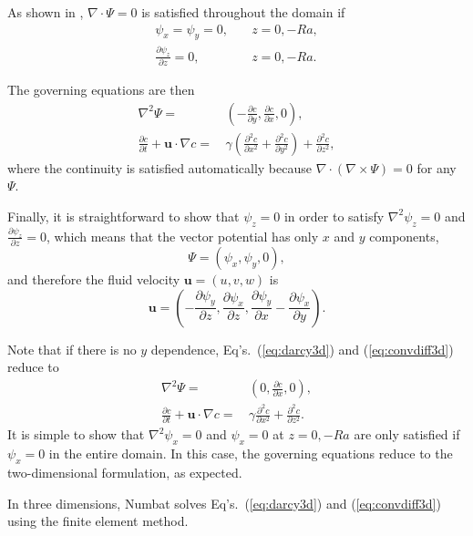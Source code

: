 \documentclass[11pt, a4paper]{csiroreport2012}
\begin{document}
As shown in \cite{E1997}, $\nabla \cdot \Psi = 0$ is satisfied throughout the domain if
\begin{align}
\psi_x = \psi_y = 0,& \quad z = 0, -Ra, \nonumber \\
\frac{\partial \psi_z}{\partial z} = 0, & \quad  z = 0, -Ra.
\end{align}

The governing equations are then
\begin{align}
\nabla^2 \Psi = \,& \left(-\frac{\partial c}{\partial y}, \frac{\partial c}{\partial x}, 0 \right), \label{eq:darcy3d} \\
\frac{\partial c}{\partial t} + \mathbf{u} \cdot \nabla c = \, & \gamma \left( \frac{\partial^2 c}{\partial x^2} + \frac{\partial^2 c}{\partial y^2} \right) + \frac{\partial^2 c}{\partial z^2}, \label{eq:convdiff3d}
\end{align}
where the continuity is satisfied automatically because $\nabla \cdot \left( \nabla \times \Psi \right) = 0$ for any $\Psi$.

Finally, it is straightforward to show that $\psi_z = 0$ in order to satisfy $\nabla^2 \psi_z = 0$ and $\frac{\partial \psi_z}{\partial z} = 0$, which means that the vector potential has only $x$ and $y$ components,
\begin{equation}
\Psi = (\psi_x, \psi_y, 0),
\end{equation}
and therefore the fluid velocity $\mathbf{u} = (u, v, w)$ is
\begin{equation}
\mathbf{u} = \left( -\frac{\partial \psi_y}{\partial z}, \frac{\partial \psi_x}{\partial z}, \frac{\partial \psi_y}{\partial x} - \frac{\partial \psi_x}{\partial y} \right).
\end{equation}

Note that if there is no $y$ dependence, Eq's.~(\ref{eq:darcy3d}) and (\ref{eq:convdiff3d}) reduce to
\begin{align}
\nabla^2 \Psi = \, & \left(0, \frac{\partial c}{\partial x}, 0 \right), \\
\frac{\partial c}{\partial t} + \mathbf{u} \cdot \nabla c = \, & \gamma \frac{\partial^2 c}{\partial x^2}  + \frac{\partial^2 c}{\partial z^2}.
\end{align}
It is simple to show that $\nabla^2 \psi_x = 0$ and $\psi_x = 0$ at $z = 0, -Ra$ are only satisfied if $\psi_x = 0$ in the entire domain. In this case, the governing equations reduce to the two-dimensional formulation, as expected.

In three dimensions, Numbat solves Eq's.~(\ref{eq:darcy3d}) and (\ref{eq:convdiff3d}) using the finite element method.
\end{document}

